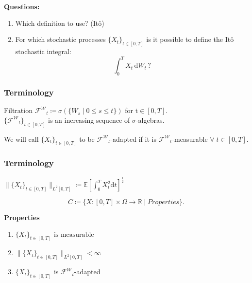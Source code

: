 \begin{frame}

\textbf{Questions:}
\begin{enumerate}
\item Which definition to use? (It\^o)
\item For which stochastic processes \(\{X_t\}_{t\in[0,T]}\) is it possible to define the  It\^o stochastic integral:
\[\int_0^T \! X_t \, \mathrm{d}W_{t}\,?\]
\end{enumerate}


\end{frame}



\begin{frame}
\frametitle{Terminology}
\begin{definition}
Filtration \(\mathcal{F^W}_t\coloneqq\sigma(\{W_s\mid 0\leq s\leq t\})\) for t\;\(\in[0,T]\).\\
\(\{\mathcal{F^W}_t\}_{t\in[0,T]}\) is an increasing sequence of \(\sigma\)-algebras.
\end{definition}
\begin{definition}
We will call \(\{X_t\}_{t\in[0,T]}\) to be \(\mathcal{F^W}_t\)-adapted if it is \(\mathcal{F^W}_t\)-measurable \(\forall\; t\in[0,T].\)
\end{definition}

\end{frame}




\begin{frame}
\frametitle{Terminology}
\begin{definition}
\(\|\{X_t\}_{t\in[0,T]}\|_{L^2[0,T]}\coloneqq\mathbb{E}[\int^{T}_{0}X_t^2\mathrm{d}t]^\frac{1}{2}\)
\end{definition}


\begin{definition}
\[C \coloneqq \{X\!: [0,T]\times\Omega \rightarrow \mathbb{R}\mid  Properties \}.\]
\end{definition}

\textbf{Properties}
\begin{enumerate}
\item \(\{X_t\}_{t\in[0,T]} \text{ is measurable}\)     
\item \(\|\{X_t\}_{t\in[0,T]}\|_{L^2[0,T]}<\infty\)
\item \(\{X_t\}_{t\in[0,T]}\) is \(\mathcal{F^W}_t\)-adapted 
\end{enumerate}
\end{frame}


